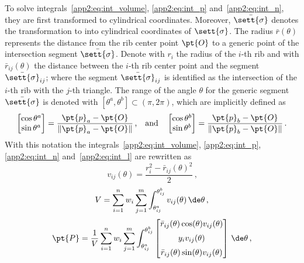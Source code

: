 To solve integrals~\eqref{app2:eq:int_volume}, \eqref{app2:eq:int_p} and~\eqref{app2:eq:int_n}, they are first transformed to cylindrical coordinates. Moreover, $\bar{\sett{\sigma}}$ denotes the transformation to into cylindrical coordinates of $\sett{\sigma}$. The radius $\bar{r}(\theta)$ represents the distance from the rib center point $\pt{O}$ to a generic point of the intersection segment $\bar{\sett{\sigma}}$. Denote with $r_i$ the radius of the $i$-th rib and with $\bar{r}_{ij}(\theta)$ the distance between the $i$-th rib center point and the segment $\bar{\sett{\sigma}}_{ij}$; where the segment $\bar{\sett{\sigma}}_{ij}$ is identified as the intersection of the $i$-th rib with the $j$-th triangle. The range of the angle $\theta$ for the generic segment $\bar{\sett{\sigma}}$ is denoted with $[\theta^a,\theta^b]\subset (\pi,2\pi)$, which are implicitly defined as
%
\begin{equation*}
  \begin{bmatrix} \cos \theta^a \\ \sin \theta^a \end{bmatrix}=
  \dfrac{\pt{p}_a - \pt{O}}{\|\pt{p}_a - \pt{O}\|}
   \, \text{,} \quad \text{and} \quad
  \begin{bmatrix} \cos \theta^b \\ \sin \theta^b \end{bmatrix}=
  \dfrac{\pt{p}_b - \pt{O}}{\|\pt{p}_b - \pt{O}\|}
  \, \text{.}
\end{equation*}
%
With this notation the integrals~\eqref{app2:eq:int_volume}, \eqref{app2:eq:int_p}, \eqref{app2:eq:int_n} and~\eqref{app2:eq:int_l} are rewritten as
%
\begin{equation}
  v_{ij}(\theta) = \dfrac{r_i^2-\bar{r}_{ij}(\theta)^2}{2}
   \, \text{,}
  \label{app2:eq:int_v_ij}
\end{equation}
%
\begin{equation}
  V = \sum_{i=1}^{n}w_i \sum_{j=1}^{m} \int_{\theta^a_{ij}}^{\theta^b_{ij}} v_{ij}(\theta) \, \de\theta
   \, \text{,}
  \label{app2:eq:int_v_cyl}
\end{equation}
%
\begin{equation}
  \pt{P} =
    \dfrac{1}{V} \sum_{i=1}^{n}w_i\sum_{j=1}^{m} \displaystyle\int_{\theta^a_{ij}}^{\theta^b_{ij}}
  \begin{bmatrix}
    \bar{r}_{ij}(\theta)\cos(\theta)v_{ij}(\theta)
    \\[2mm]
    y_i v_{ij}(\theta)
    \\[2mm]
    \bar{r}_{ij}(\theta)\sin(\theta)v_{ij}(\theta)
  \end{bmatrix} \, \de\theta
   \, \text{,}
  \label{app2:eq:int_p_cyl}
\end{equation}
